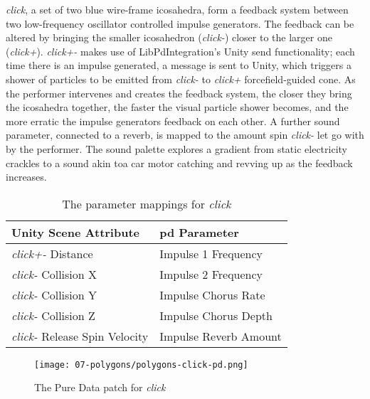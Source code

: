 \textit{click}, a set of two blue wire-frame icosahedra, form a feedback system between two low-frequency oscillator controlled impulse generators. The feedback can be altered by bringing the smaller icosahedron (\textit{click-}) closer to the larger one (\textit{click+}). \textit{click+-} makes use of LibPdIntegration's Unity send functionality; each time there is an impulse generated, a message is sent to Unity, which triggers a shower of particles to be emitted from \textit{click-} to \textit{click+} forcefield-guided cone. As the performer intervenes and creates the feedback system, the closer they bring the icosahedra together, the faster the visual particle shower becomes, and the more erratic the impulse generators feedback on each other. A further sound parameter, connected to a reverb, is mapped to the amount spin \textit{click-} let go with by the performer. The sound palette explores a gradient from static electricity crackles to a sound akin toa car motor catching and revving up as the feedback increases.
\begin{table}
    \centering
    \begin{tabular}{ l|l }
        \textbf{Unity Scene Attribute}         & \textbf{\gls{pd} Parameter}   \\
        \hline      
        \textit{click+-} Distance              & Impulse 1 Frequency           \\
        \textit{click-} Collision X            & Impulse 2 Frequency           \\
        \textit{click-} Collision Y            & Impulse Chorus Rate           \\
        \textit{click-} Collision Z            & Impulse Chorus Depth          \\
        \textit{click-} Release Spin Velocity  & Impulse Reverb Amount     
    \end{tabular}
    \caption{The parameter mappings for \textit{click}}
    \label{fig: polygons-click-mapping}
\end{table}
\begin{figure}
    \centering
    \texttt{[image: 07-polygons/polygons-click-pd.png]}
    \caption{The Pure Data patch for \textit{click}}
    \label{fig: polygons-click-pd}
\end{figure}

